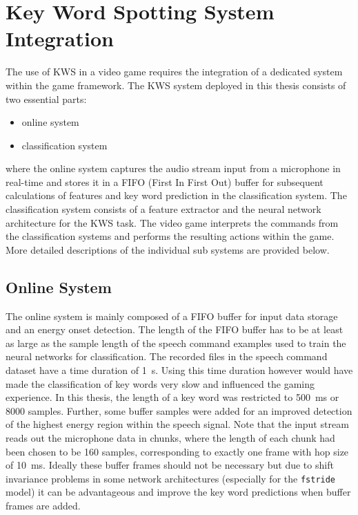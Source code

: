 
\section{Key Word Spotting System Integration}
The use of KWS in a video game requires the integration of a dedicated system within the game framework.
The KWS system deployed in this thesis consists of two essential parts:
\begin{itemize}
	\item online system
	\item classification system
\end{itemize}
where the online system captures the audio stream input from a microphone in real-time and stores it in a FIFO (First In First Out) buffer for subsequent calculations of features and key word prediction in the classification system.
The classification system consists of a feature extractor and the neural network architecture for the KWS task.
The video game interprets the commands from the classification systems and performs the resulting actions within the game.
More detailed descriptions of the individual sub systems are provided below.



\subsection{Online System}
The online system is mainly composed of a FIFO buffer for input data storage and an energy onset detection.
The length of the FIFO buffer has to be at least as large as the sample length of the speech command examples used to train the neural networks for classification.
The recorded files in the speech command dataset have a time duration of \SI{1}{\second}. 
Using this time duration however would have made the classification of key words very slow and influenced the gaming experience.
In this thesis, the length of a key word was restricted to \SI{500}{\milli\second} or 8000 samples.
Further, some buffer samples were added for an improved detection of the highest energy region within the speech signal.
Note that the input stream reads out the microphone data in chunks, where the length of each chunk had been chosen to be 160 samples, corresponding to exactly one frame with hop size of \SI{10}{\milli\second}.
Ideally these buffer frames should not be necessary but due to shift invariance problems in some network architectures (especially for the \texttt{fstride} model) it can be advantageous and improve the key word predictions when buffer frames are added.

